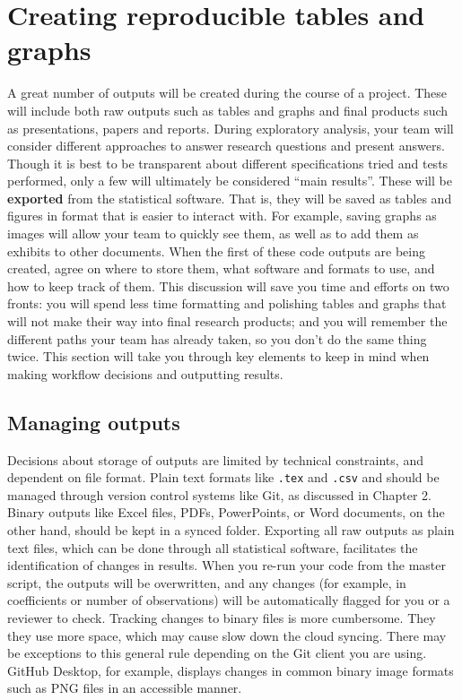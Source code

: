 \section{Creating reproducible tables and graphs}

A great number of outputs will be created during the course of a project.
These will include both raw outputs such as tables and graphs
and final products such as presentations, papers and reports.
During exploratory analysis, your team will consider different approaches
to answer research questions and present answers.
Though it is best to be transparent about different
specifications tried and tests performed,
only a few will ultimately be considered ``main results''.
These will be \textbf{exported}
from the statistical software.
That is, they will be saved as tables and figures in format that is easier to interact with.
For example, saving graphs as images will allow your team to quickly see them,
as well as to add them as exhibits to other documents.
When the first of these code outputs are being created, agree on where to store them,
what software and formats to use, and how to keep track of them.
This discussion will save you time and efforts on two fronts:
you will spend less time formatting and polishing tables and graphs that
will not make their way into final research products;
and you will remember the different paths your team has already
taken, so you don't do the same thing twice.
This section will take you through key elements to keep in mind
when making workflow decisions and outputting results.


\subsection{Managing outputs}

Decisions about storage of outputs are limited by technical constraints,
and dependent on file format.
Plain text formats like \texttt{.tex} and \texttt{.csv}
and should be managed through version control systems like Git,
as discussed in Chapter 2.
Binary outputs like Excel files, PDFs, PowerPoints, or Word documents,
on the other hand, should be kept in a synced folder.
Exporting all raw outputs as plain text files,
which can be done through all statistical software,
facilitates the identification of changes in results.
When you re-run your code from the master script,
the outputs will be overwritten,
and any changes (for example, in coefficients or number of observations)
will be automatically flagged for you or a reviewer to check.
Tracking changes to binary files is more cumbersome.
They they use more space,
which may cause slow down the cloud syncing.
There may be exceptions to this general rule
depending on the Git client you are using.
GitHub Desktop, for example,
displays changes in common binary image formats such as PNG files
in an accessible manner.

